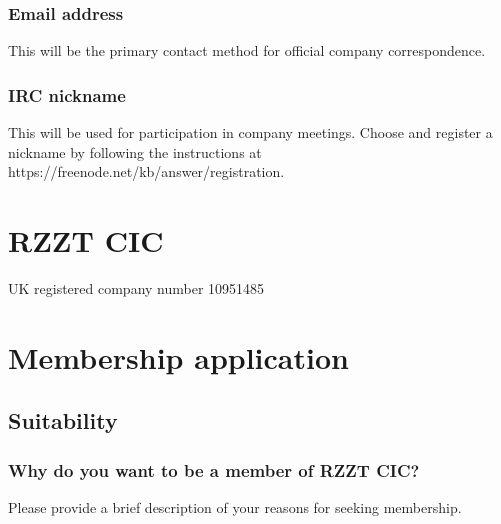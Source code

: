 \documentclass[a4paper,10pt]{article}
\begin{document}
\begin{Form}
\begin{framed}%
  \TextField[width=\textwidth,donotscroll=true,multiline=true,name=address]{ }%
\end{framed}%

\subsubsection{Email address}

This will be the primary contact method for official company correspondence.

\begin{framed}%
  \TextField[width=\textwidth,donotscroll=true,name=email]{ }%
\end{framed}%

\subsubsection{IRC nickname}

This will be used for participation in company meetings. Choose and register a nickname by following the instructions at https://freenode.net/kb/answer/registration.

\begin{framed}%
  \TextField[width=\textwidth,donotscroll=true,name=ircnick]{ }%
\end{framed}%

\newpage

\section{RZZT CIC}

UK registered company number 10951485

\section{Membership application}

\subsection{Suitability}

\subsubsection{Why do you want to be a member of RZZT CIC?}

Please provide a brief description of your reasons for seeking membership.


\end{Form}
\end{document}
